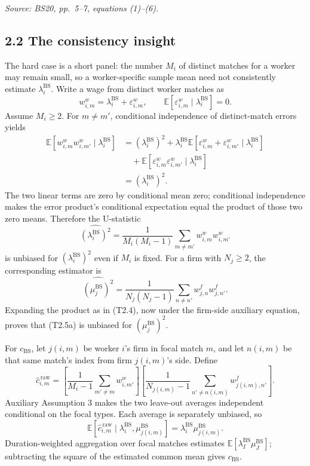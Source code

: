 \documentclass[11pt]{article}
\begin{document}
\textit{Source: BS20, pp.\ 5--7, equations (1)--(6).}

\subsection{2.2 The consistency insight}

The hard case is a short panel: the number \(M_i\) of distinct matches for a
worker may remain small, so a worker-specific sample mean need not consistently
estimate \(\lambda_i^{\mathrm{BS}}\).  Write a wage from distinct worker
matches as
\[
w^w_{i,m}=\lambda_i^{\mathrm{BS}}+\varepsilon^w_{i,m},
\qquad
\mathbb E[\varepsilon^w_{i,m}\mid\lambda_i^{\mathrm{BS}}]=0.
\tag{T2.3}
\]
Assume \(M_i\geq2\).  For \(m\neq m'\), conditional independence of
distinct-match errors yields
\[
\begin{aligned}
\mathbb E[w^w_{i,m}w^w_{i,m'}\mid\lambda_i^{\mathrm{BS}}]
&=
(\lambda_i^{\mathrm{BS}})^2
+\lambda_i^{\mathrm{BS}}
\mathbb E[\varepsilon^w_{i,m}+\varepsilon^w_{i,m'}
\mid\lambda_i^{\mathrm{BS}}]\\
&\quad+
\mathbb E[\varepsilon^w_{i,m}\varepsilon^w_{i,m'}
\mid\lambda_i^{\mathrm{BS}}]\\
&=(\lambda_i^{\mathrm{BS}})^2.
\end{aligned}
\tag{T2.4}
\]
The two linear terms are zero by conditional mean zero; conditional
independence makes the error product's conditional expectation equal the
product of those two zero means.
Therefore the U-statistic
\[
\widehat{(\lambda_i^{\mathrm{BS}})^2}
=
\frac{1}{M_i(M_i-1)}
\sum_{m\neq m'}w^w_{i,m}w^w_{i,m'}
\tag{T2.5}
\]
is unbiased for \((\lambda_i^{\mathrm{BS}})^2\) even if \(M_i\) is fixed.
For a firm with \(N_j\geq2\), the corresponding estimator is
\[
\widehat{(\mu_j^{\mathrm{BS}})^2}
=
\frac{1}{N_j(N_j-1)}
\sum_{n\neq n'}w^f_{j,n}w^f_{j,n'}.
\tag{T2.5a}
\]
Expanding the product as in (T2.4), now under the firm-side auxiliary
equation, proves that (T2.5a) is unbiased for
\((\mu_j^{\mathrm{BS}})^2\).

For \(c_{\mathrm{BS}}\), let \(j(i,m)\) be worker \(i\)'s firm in focal match
\(m\), and let \(n(i,m)\) be that same match's index from firm \(j(i,m)\)'s
side.  Define
\[
\widehat c_{i,m}^{\,\mathrm{raw}}
=
\left[
\frac{1}{M_i-1}\sum_{m'\neq m}w^w_{i,m'}
\right]
\left[
\frac{1}{N_{j(i,m)}-1}
\sum_{n'\neq n(i,m)}w^f_{j(i,m),n'}
\right].
\tag{T2.5b}
\]
Auxiliary Assumption 3 makes the two leave-out averages independent
conditional on the focal types.  Each average is separately unbiased, so
\[
\mathbb E[
\widehat c_{i,m}^{\,\mathrm{raw}}
\mid\lambda_i^{\mathrm{BS}},\mu_{j(i,m)}^{\mathrm{BS}}]
=
\lambda_i^{\mathrm{BS}}\mu_{j(i,m)}^{\mathrm{BS}}.
\tag{T2.5c}
\]
Duration-weighted aggregation over focal matches estimates
\(\mathbb E[\lambda_I^{\mathrm{BS}}\mu_J^{\mathrm{BS}}]\); subtracting the
square of the estimated common mean gives \(c_{\mathrm{BS}}\).
\end{document}
